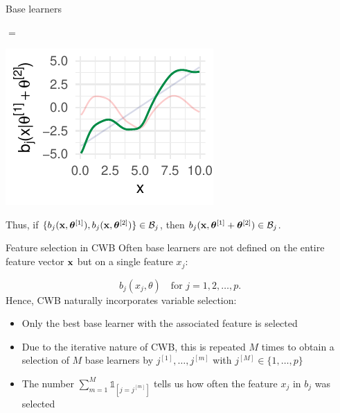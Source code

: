 \documentclass[11pt,compress,t,notes=noshow, xcolor=table]{beamer}
\begin{document}
\begin{vbframe}{Base learners}
\begin{center}
\begin{minipage}{.05\linewidth}
$\bm{=}$
\end{minipage}
\begin{minipage}{.25\linewidth}
\includegraphics{figure/boosting-cwb-bl-add3.pdf}
\end{minipage}
\end{center}
\vspace*{0.1cm}

Thus, if $\{ b_j(\mathbf{x}, \bm{\theta}^{[1]}), b_j(\mathbf{x}, \bm{\theta}^{[2]}) \} \in \mathcal{B}_j$, then $b_j(\mathbf{x}, \bm{\theta}^{[1]} + \bm{\theta}^{[2]}) \in \mathcal{B}_j$.

%
%
%

\end{vbframe}


\begin{vbframe}{Feature selection in CWB}
Often base learners are not defined on the entire feature vector $\mathbf{x}$ but on
a single feature $x_j$:

$$
  b_j(x_j, \theta) \quad \text{for } j = 1, 2, \dots, p.
$$
Hence, CWB naturally incorporates variable selection:
\begin{itemize}
    \item Only the best base learner with the associated feature is selected
    \item Due to the iterative nature of CWB, this is repeated $M$ times to obtain a selection of $M$ base learners by $j^{[1]}, \dots, j^{[m]}$ with $j^{[M]}\in\{1, \dots, p\}$
    \item The number $\sum_{m=1}^M \mathds{1}_{[j = j^{[m]}]}$ tells us how often the feature $x_j$ in $b_j$ was selected
\end{itemize}
\end{vbframe}
\end{document}
